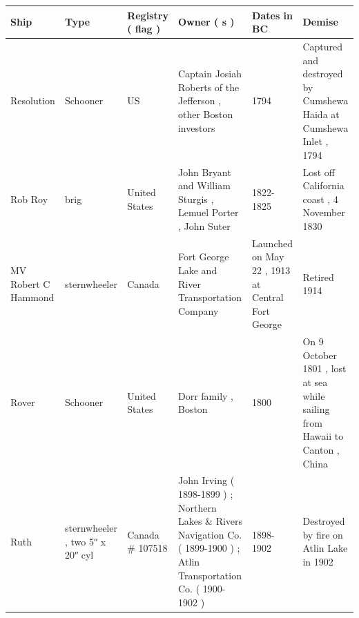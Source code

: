 \documentclass{article}
\begin{document}
\begin{tabular}{llllll}
\toprule
Ship & Type & Registry ( flag ) & Owner ( s ) & Dates in BC & Demise \\
\midrule
Resolution & Schooner & US & Captain Josiah Roberts of the Jefferson , other Boston investors & 1794 & Captured and destroyed by Cumshewa Haida at Cumshewa Inlet , 1794 \\
Rob Roy & brig & United States & John Bryant and William Sturgis , Lemuel Porter , John Suter & 1822-1825 & Lost off California coast , 4 November 1830 \\
MV Robert C Hammond & sternwheeler & Canada & Fort George Lake and River Transportation Company & Launched on May 22 , 1913 at Central Fort George & Retired 1914 \\
Rover & Schooner & United States & Dorr family , Boston & 1800 & On 9 October 1801 , lost at sea while sailing from Hawaii to Canton , China \\
Ruth & sternwheeler , two 5ʺ x 20ʺ cyl & Canada \# 107518 & John Irving ( 1898-1899 ) ; Northern Lakes \& Rivers Navigation Co. ( 1899-1900 ) ; Atlin Transportation Co. ( 1900-1902 ) & 1898-1902 & Destroyed by fire on Atlin Lake in 1902 \\
\bottomrule
\end{tabular}
\end{document}
